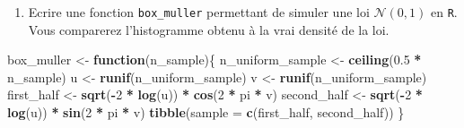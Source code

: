 \documentclass[]{article}
\newenvironment{Shaded}{\begin{snugshade}}{\end{snugshade}}
\newcommand{\ControlFlowTok}[1]{\textcolor[rgb]{0.13,0.29,0.53}{\textbf{#1}}}
\newcommand{\DataTypeTok}[1]{\textcolor[rgb]{0.13,0.29,0.53}{#1}}
\newcommand{\DecValTok}[1]{\textcolor[rgb]{0.00,0.00,0.81}{#1}}
\newcommand{\FloatTok}[1]{\textcolor[rgb]{0.00,0.00,0.81}{#1}}
\newcommand{\KeywordTok}[1]{\textcolor[rgb]{0.13,0.29,0.53}{\textbf{#1}}}
\newcommand{\NormalTok}[1]{#1}
\newcommand{\OperatorTok}[1]{\textcolor[rgb]{0.81,0.36,0.00}{\textbf{#1}}}
\newcommand{\StringTok}[1]{\textcolor[rgb]{0.31,0.60,0.02}{#1}}
\providecommand{\tightlist}{%
  \setlength{\itemsep}{0pt}\setlength{\parskip}{0pt}}
\begin{document}
\begin{enumerate}
\def\labelenumi{\arabic{enumi}.}
\setcounter{enumi}{1}
\tightlist
\item
  Ecrire une fonction \texttt{box\_muller} permettant de simuler une loi
  \(\mathcal{N}(0, 1)\) en \texttt{R}. Vous comparerez l'histogramme
  obtenu à la vrai densité de la loi.
\end{enumerate}

\begin{Shaded}
\begin{Highlighting}[]
\NormalTok{box_muller <-}\StringTok{ }\ControlFlowTok{function}\NormalTok{(n_sample)\{}
\NormalTok{  n_uniform_sample <-}\StringTok{ }\KeywordTok{ceiling}\NormalTok{(}\FloatTok{0.5} \OperatorTok{*}\StringTok{ }\NormalTok{n_sample)}
\NormalTok{  u <-}\StringTok{ }\KeywordTok{runif}\NormalTok{(n_uniform_sample)}
\NormalTok{  v <-}\StringTok{ }\KeywordTok{runif}\NormalTok{(n_uniform_sample)}
\NormalTok{  first_half <-}\StringTok{ }\KeywordTok{sqrt}\NormalTok{(}\OperatorTok{-}\DecValTok{2} \OperatorTok{*}\StringTok{ }\KeywordTok{log}\NormalTok{(u)) }\OperatorTok{*}\StringTok{ }\KeywordTok{cos}\NormalTok{(}\DecValTok{2} \OperatorTok{*}\StringTok{ }\NormalTok{pi }\OperatorTok{*}\StringTok{ }\NormalTok{v)}
\NormalTok{  second_half <-}\StringTok{ }\KeywordTok{sqrt}\NormalTok{(}\OperatorTok{-}\DecValTok{2} \OperatorTok{*}\StringTok{ }\KeywordTok{log}\NormalTok{(u)) }\OperatorTok{*}\StringTok{ }\KeywordTok{sin}\NormalTok{(}\DecValTok{2} \OperatorTok{*}\StringTok{ }\NormalTok{pi }\OperatorTok{*}\StringTok{ }\NormalTok{v)}
  \KeywordTok{tibble}\NormalTok{(}\DataTypeTok{sample =} \KeywordTok{c}\NormalTok{(first_half, second_half))}
\NormalTok{\}}
\end{Highlighting}
\end{Shaded}

\begin{Shaded}
\end{Shaded}
\end{document}
